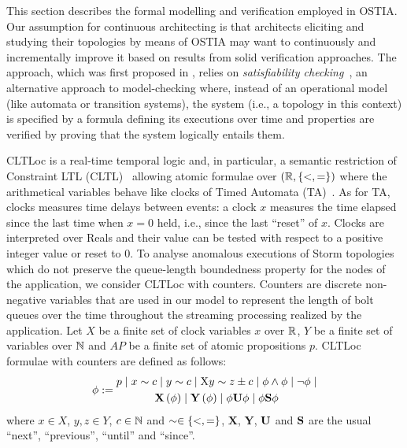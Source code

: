 This section describes the formal modelling and verification employed in OSTIA. Our assumption for continuous architecting is that architects eliciting and studying their topologies by means of OSTIA may want to continuously and incrementally improve it based on results from solid verification approaches. The approach, which was first proposed in \cite{MBER16}, relies on \textit{satisfiability checking}~\cite{MPS13}, an alternative approach to model-checking where, instead of an operational model (like automata or transition systems), the system (i.e., a topology in this context) is specified by a formula defining its executions over time and properties are verified by proving that the system logically entails them.

CLTLoc is a real-time temporal logic and, in particular, a semantic restriction of Constraint LTL (CLTL)~\cite{DD07} allowing atomic formulae over $(\mathbb{R}, \{ <,= \})$ where the arithmetical variables behave like clocks of Timed Automata (TA)~\cite{timed}.
As for TA, clocks measures time delays between events: a clock $x$ measures the time elapsed since the last time when $x=0$ held, i.e., since the last ``reset'' of $x$.
Clocks are interpreted over Reals and their value can be tested with respect to a positive integer value or reset to 0.
%
To analyse anomalous executions of Storm topologies which do not preserve the queue-length boundedness property for the nodes of the application, we consider CLTLoc with counters.
Counters are discrete non-negative variables that are used in our model to represent the length of bolt queues over the time throughout the streaming processing realized by the application.
Let $X$ be a finite set of clock variables $x$ over $\mathbb{R}$, $Y$ be a finite set of variables over $\mathbb{N}$ and $AP$ be a finite set of atomic propositions $p$.
CLTLoc formulae with counters are defined as follows:
\begin{equation*}%
  \phi :=
  \begin{gathered}
    p \mid x\sim c \mid y\sim c\mid \aX y\sim z\pm c \mid\phi \wedge \phi \mid \neg \phi \mid \\
       \X{\phi} \mid \Y{\phi} %
\mid \phi\U\phi \mid \phi\Snc\phi
  \end{gathered}
\end{equation*}
where $x \in X$, $y,z \in Y$, $c \in \mathbb{N}$ and 
$\sim \in \{ <,= \}$, $\mathbf{X}$, $\mathbf{Y}$, $\mathbf{U}$ and $\mathbf{S}$ are the
usual ``next'', ``previous'', ``until'' and ``since''.
